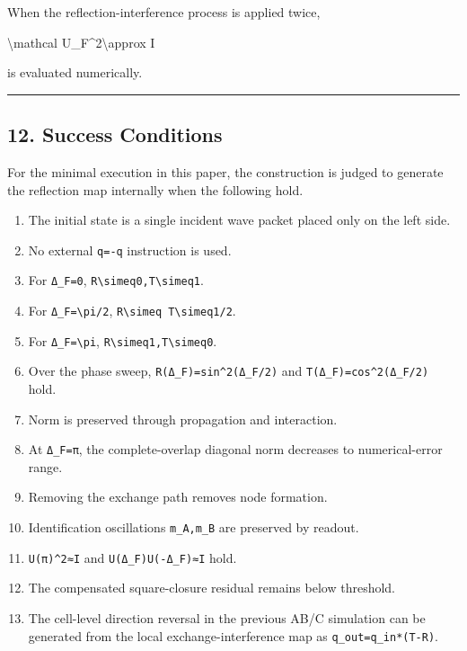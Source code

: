 \documentclass[
  a4paper,
]{article}
\newenvironment{Shaded}{}{}
\newcommand{\NormalTok}[1]{#1}
\providecommand{\tightlist}{%
  \setlength{\itemsep}{0pt}\setlength{\parskip}{0pt}}
\begin{document}
When the reflection-interference process is applied twice,

\begin{Shaded}
\begin{Highlighting}[]
\NormalTok{\textbackslash{}mathcal U\_F\^{}2\textbackslash{}approx I}
\end{Highlighting}
\end{Shaded}

is evaluated numerically.

\begin{center}\rule{0.5\linewidth}{0.5pt}\end{center}

\subsection{12. Success Conditions}\label{success-conditions}

For the minimal execution in this paper, the construction is judged to
generate the reflection map internally when the following hold.

\begin{enumerate}
\def\labelenumi{\arabic{enumi}.}
\tightlist
\item
  The initial state is a single incident wave packet placed only on the
  left side.
\item
  No external \texttt{q=-q} instruction is used.
\item
  For \texttt{Δ\_F=0},
  \texttt{R\textbackslash{}simeq0,T\textbackslash{}simeq1}.
\item
  For \texttt{Δ\_F=\textbackslash{}pi/2},
  \texttt{R\textbackslash{}simeq\ T\textbackslash{}simeq1/2}.
\item
  For \texttt{Δ\_F=\textbackslash{}pi},
  \texttt{R\textbackslash{}simeq1,T\textbackslash{}simeq0}.
\item
  Over the phase sweep, \texttt{R(Δ\_F)=sin\^{}2(Δ\_F/2)} and
  \texttt{T(Δ\_F)=cos\^{}2(Δ\_F/2)} hold.
\item
  Norm is preserved through propagation and interaction.
\item
  At \texttt{Δ\_F=π}, the complete-overlap diagonal norm decreases to
  numerical-error range.
\item
  Removing the exchange path removes node formation.
\item
  Identification oscillations \texttt{m\_A,m\_B} are preserved by
  readout.
\item
  \texttt{U(π)\^{}2≈I} and \texttt{U(Δ\_F)U(-Δ\_F)≈I} hold.
\item
  The compensated square-closure residual remains below threshold.
\item
  The cell-level direction reversal in the previous AB/C simulation can
  be generated from the local exchange-interference map as
  \texttt{q\_out=q\_in*(T-R)}.
\end{enumerate}
\end{document}
